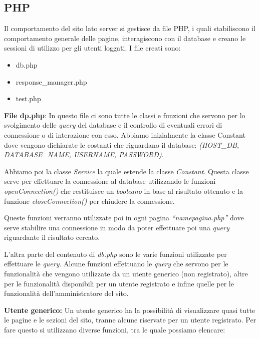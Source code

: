 \subsection{PHP}
Il comportamento del sito lato server si gestisce da file PHP, i quali stabiliscono il comportamento generale delle pagine, interagiscono con il database e creano le sessioni di utilizzo per gli utenti loggati. I file creati sono:
\begin{itemize}
	\item db.php
	\item response\_manager.php
	\item test.php
\end{itemize}

\textbf{File dp.php}: In questo file ci sono tutte le classi e funzioni che servono per lo svolgimento delle \textit{query} del database e il controllo di eventuali errori di connessione o di interazione con esso. Abbiamo inizialmente la classe Constant dove vengono dichiarate le costanti che riguardano il database: \textit{(HOST\_DB, DATABASE\_NAME, USERNAME, PASSWORD)}.

Abbiamo poi la classe \textit{Service} la quale estende la classe \textit{Constant}. Questa classe serve per effettuare la connessione al database utilizzando le funzioni \textit{openConnection()} che restituisce un \textit{booleano} in base al risultato ottenuto e la funzione \textit{closeConnection()} per chiudere la connessione.

Queste funzioni verranno utilizzate poi in ogni pagina \textit{“namepagina.php”} dove serve stabilire una connessione in modo da poter effettuare poi una \textit{query} riguardante il risultato cercato.

L’altra parte del contenuto di \textit{db.php} sono le varie funzioni utilizzate per effettuare le \textit{query}. Alcune funzioni effettuano le \textit{query} che servono per le funzionalità che vengono utilizzate da un utente generico (non registrato), altre per le funzionalità disponibili per un utente registrato e infine quelle per le funzionalità dell'amministratore del sito.

\textbf{Utente generico:} Un utente generico ha la possibilità di visualizzare quasi tutte le pagine e le sezioni del sito, tranne alcune riservate per un utente registrato. Per fare questo si utilizzano diverse funzioni, tra le quale possiamo elencare:

